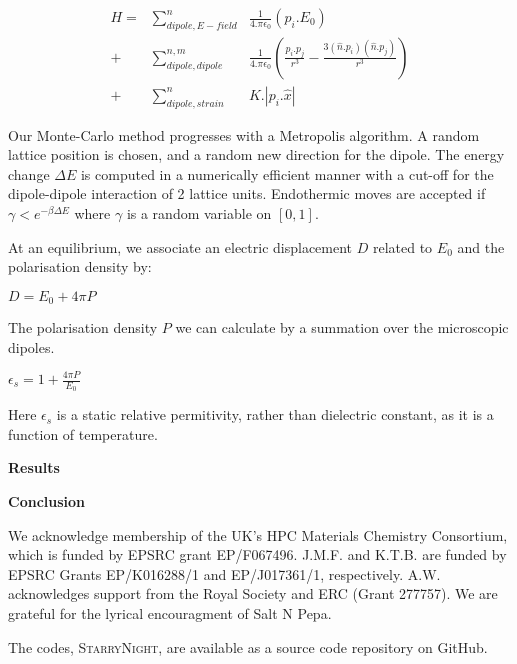 \documentclass[journal=jacsat,manuscript=communication]{achemso}
\begin{document}
\begin{align}
H = &\sum^n_{dipole,E-field} &\frac{1}{4.\pi \epsilon_0} (p_i.E_0) \\
+ &\sum^{n,m}_{dipole,dipole} &\frac{1}{4.\pi \epsilon_0} (\frac{p_i.p_j}{r^3}-\frac{3(\hat{n}.p_i)(\hat{n}.p_j)}{r^3}) \\
+ &\sum^n_{dipole,strain} &K.|p_i.\hat{x}|
\end{align}  

Our Monte-Carlo method progresses with a Metropolis algorithm. 
A random lattice position is chosen, and a random new direction for the dipole. 
The energy change $\Delta E$ is computed in a numerically efficient manner with a cut-off for the dipole-dipole interaction of 2 lattice units. 
Endothermic moves are accepted if $\gamma < e^{-\beta \Delta E}$ where $\gamma$ is a random variable on $[0,1]$.

At an equilibrium, we associate an electric displacement $D$ related to $E_0$ and the polarisation density by:

$D =  E_0 + 4\pi P$

The polarisation density $P$ we can calculate by a summation over the microscopic dipoles. 

$\epsilon_s = 1+ \frac{4\pi P}{E_0}$

Here $\epsilon_s$ is a static relative permitivity, rather than dielectric constant, as it is a function of temperature.



\textbf{Results}

\textbf{Conclusion}


\begin{acknowledgement}
We acknowledge membership of the UK's HPC Materials Chemistry Consortium, which is funded by EPSRC grant EP/F067496. 
J.M.F. and K.T.B. are funded by EPSRC Grants EP/K016288/1 and EP/J017361/1, respectively.
A.W. acknowledges support from the Royal Society and ERC (Grant 277757). 
We are grateful for the lyrical encouragment of Salt N Pepa. 
\end{acknowledgement}

\begin{suppinfo}
    The codes, \textsc{StarryNight}, are available as a source code repository on GitHub\cite{GitHub}.
\end{suppinfo}


\end{document}

